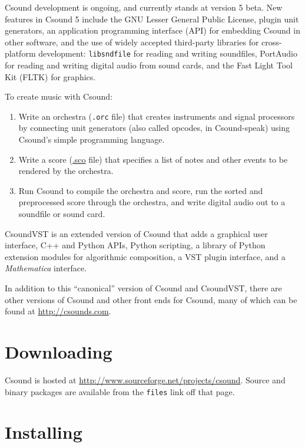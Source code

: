 \documentclass[10pt,letterpaper,onecolumn]{book}
\begin{document}
Csound development is ongoing, and currently stands at version 5 beta. New features in Csound 5 include the GNU Lesser General Public License, plugin unit generators, an application programming interface (API) for embedding Csound in other software, and the use of widely accepted third-party libraries for cross-platform development: \texttt{libsndfile} for reading and writing soundfiles, PortAudio for reading and writing digital audio from sound cards, and the Fast Light Tool Kit (FLTK) for graphics.

To create music with Csound:

\begin{enumerate}
\item Write an orchestra (\texttt{.orc} file) that creates instruments and signal processors by connecting unit generators (also called opcodes, in Csound-speak) using Csound's simple programming language.
\item Write a score (\url{.sco} file) that specifies a list of notes and other events to be rendered by the orchestra.
\item Run Csound to compile the orchestra and score, run the sorted and preprocessed score through the orchestra, and write digital audio out to a soundfile or sound card.
\end{enumerate}

CsoundVST is an extended version of Csound that adds a graphical user interface, C++ and Python APIs, Python scripting, a library of Python extension modules for algorithmic composition, a VST plugin interface, and a \emph{Mathematica} interface.

In addition to this ``canonical'' version of Csound and CsoundVST, there are other versions of Csound and other front ends for Csound, many of which can be found at \url{http://csounds.com}.

\section{Downloading}

Csound is hosted at \url{http://www.sourceforge.net/projects/csound}. \linebreak Source and binary packages are available from the \texttt{files} link off that page.

\section{Installing}
\end{document}
